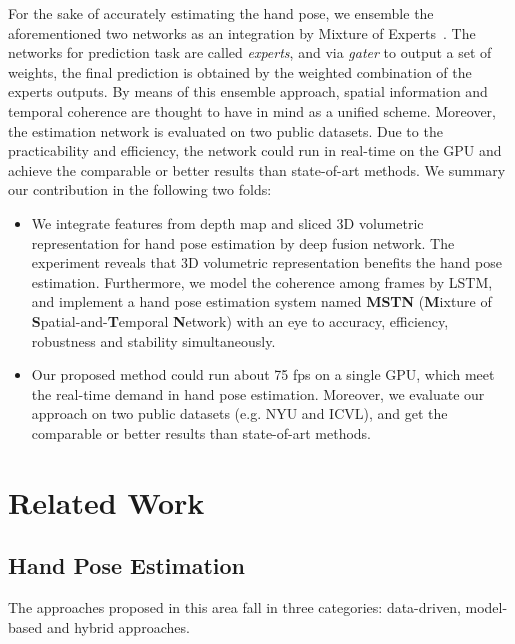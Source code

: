 \documentclass[journal,comsoc]{IEEEtran}
\begin{document}
For the sake of accurately estimating the hand pose, we ensemble the aforementioned two networks as an
integration by Mixture of Experts~\cite{jacobs1991adaptive}. The networks for prediction task are called
\emph{experts}, and via \emph{gater} to output a set of weights, the final prediction is obtained by the
weighted combination of the experts outputs. By means of this ensemble approach, spatial information and temporal
coherence are thought to have in mind as a unified scheme. Moreover, the estimation network is evaluated on
two public datasets. Due to the practicability and efficiency, the network could run in real-time on the GPU and achieve
the comparable or better results than state-of-art methods. We summary our contribution in the following two folds:
\begin{itemize}
  \item
  We integrate features from depth map and sliced 3D volumetric representation for hand pose
  estimation by deep fusion network. The experiment reveals that 3D volumetric representation
  benefits the hand pose estimation. Furthermore, we model the coherence among frames by LSTM,
  and implement a hand pose estimation system named \textbf{MSTN} (\textbf{M}ixture of
  \textbf{S}patial-and-\textbf{T}emporal \textbf{N}etwork) with an eye to accuracy, efficiency,
  robustness and stability simultaneously.
  \item
  Our proposed method could run about 75 fps on a single GPU, which meet the real-time demand
  in hand pose estimation. Moreover, we evaluate our approach on two public datasets (e.g. NYU
  and ICVL), and get the comparable or better results than state-of-art methods.
\end{itemize}


\section{Related Work}\label{sec:related work}
\subsection{Hand Pose Estimation}
The approaches proposed in this area fall in three categories: data-driven, model-based and hybrid approaches.
\end{document}
